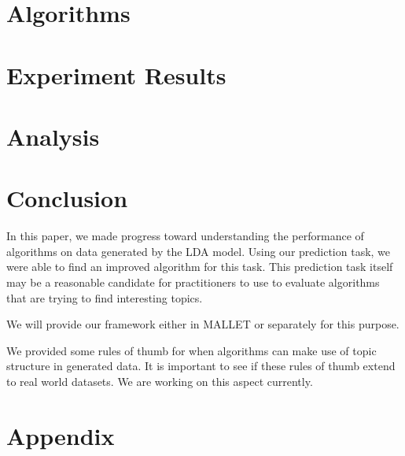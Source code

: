 \documentclass{sig-alternate}
\begin{document}
\section{Algorithms}
\label{sec:algs}

\section{Experiment Results}
\label{sec:results}


\section{Analysis}
\label{sec:analysis}


\section{Conclusion}
\label{sec:conclusion}

In this paper, we made progress toward understanding the performance
of algorithms on data generated by the LDA model.  Using our
prediction task, we were able to find an improved algorithm for this
task.  This prediction task itself may be a reasonable candidate for
practitioners to use to evaluate algorithms that are trying to find
interesting topics. 

We will provide our framework either in MALLET
\cite{McCallumMALLET} or separately for this purpose.

We provided some rules of thumb for when algorithms can make
use of topic structure in generated data.  It is important
to see if these rules of thumb extend to real world datasets.
We are working on this aspect currently.







\section{Appendix}

\end{document}
